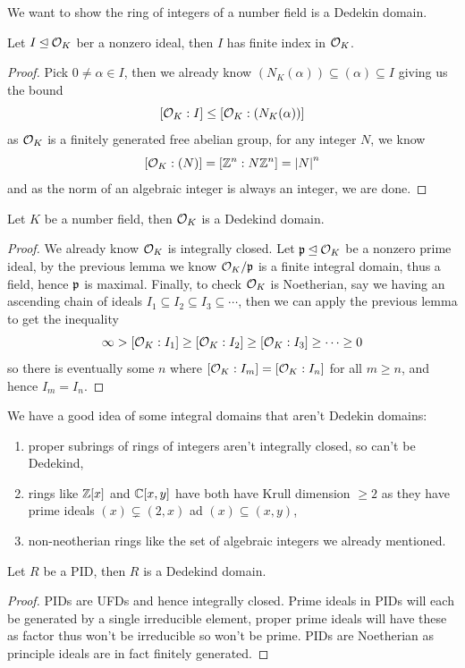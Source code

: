 \documentclass{article}
\begin{document}
We want to show the ring of integers of a number field is a Dedekin domain.

\begin{lemma}
    Let $I\unlhd \mathcal{O}_K$ ber a nonzero ideal, then $I$ has finite index in $\mathcal{O}_K$.
    \begin{proof}
        Pick $0\neq\alpha\in I$, then we already know $(N_K(\alpha))\subseteq (\alpha) \subseteq I$ giving us the bound \[[\mathcal{O}_K:I]\leq[\mathcal{O}_K:(N_K(\alpha))]\] as $\mathcal{O}_K$ is a finitely generated free abelian group, for any integer $N$, we know \[
        [\mathcal{O}_K:(N)] = [\mathbb{Z}^n:N\mathbb{Z}^n] = \left| N \right|^n
        \] and as the norm of an algebraic integer is always an integer, we are done.
    \end{proof}
\end{lemma}

\begin{proposition}
    Let $K$ be a number field, then $\mathcal{O}_K$ is a Dedekind domain.
    \begin{proof}
        We already know $\mathcal{O}_K$ is integrally closed. Let $\mathfrak{p}\unlhd\mathcal{O}_K$ be a nonzero prime ideal, by the previous lemma we know $\mathcal{O}_K/\mathfrak{p}$ is a finite integral domain, thus a field, hence $\mathfrak{p}$ is maximal. Finally, to check $\mathcal{O}_K$ is Noetherian, say we having an ascending chain of ideals $I_1\subseteq I_2\subseteq I_3 \subseteq \cdots$, then we can apply the previous lemma to get the inequality  \[
        \infty > [\mathcal{O}_K:I_1] \geq [\mathcal{O}_K:I_2] \geq [\mathcal{O}_K:I_3]\geq \cdots \geq 0
        \] so there is eventually some $n$ where $[\mathcal{O}_K:I_m] = [\mathcal{O}_K:I_n]$ for all $m\geq n$, and hence $I_m=I_n$.
    \end{proof}
\end{proposition}

We have a good idea of some integral domains that aren't Dedekin domains: \begin{enumerate}
    \item proper subrings of rings of integers aren't integrally closed, so can't be Dedekind,
    \item rings like $\mathbb{Z}[x]$ and $\mathbb{C}[x,y]$ have both have Krull dimension $\geq 2$ as they have prime ideals $(x)\subsetneq (2,x)$ ad $(x)\subseteq (x,y)$,
    \item non-neotherian rings like the set of algebraic integers we already mentioned.
\end{enumerate}

\begin{proposition}
    Let $R$ be a PID, then $R$ is a Dedekind domain.
    \begin{proof}
        PIDs are UFDs and hence integrally closed. Prime ideals in PIDs will each be generated by a single irreducible element, proper prime ideals will have these as factor thus won't be irreducible so won't be prime. PIDs are Noetherian as principle ideals are in fact finitely generated.
    \end{proof}
\end{proposition}
\end{document}
